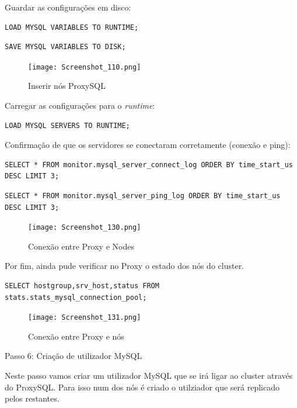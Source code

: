 \hfill \break
\indent Guardar as configurações em disco:
\begin{verbatim}LOAD MYSQL VARIABLES TO RUNTIME;\end{verbatim}
\begin{verbatim}SAVE MYSQL VARIABLES TO DISK;\end{verbatim}

\begin{figure}[H]
\center
\texttt{[image: Screenshot\_110.png]}
\caption{Inserir nós ProxySQL}
\end{figure}

\hfill \break
\indent Carregar as configurações para o \textit{runtime}:

\begin{verbatim}LOAD MYSQL SERVERS TO RUNTIME;\end{verbatim}

\newpage
Confirmação de que os servidores se conectaram corretamente (conexão e ping):

\begin{verbatim}SELECT * FROM monitor.mysql_server_connect_log ORDER BY time_start_us 
DESC LIMIT 3;\end{verbatim}

\begin{verbatim}SELECT * FROM monitor.mysql_server_ping_log ORDER BY time_start_us 
DESC LIMIT 3;\end{verbatim}


\begin{figure}[H]
\center
\texttt{[image: Screenshot\_130.png]}
\caption{Conexão entre Proxy e Nodes}
\end{figure}

\indent Por fim, ainda pude verificar no Proxy o estado dos nós do cluster.

\begin{verbatim}SELECT hostgroup,srv_host,status FROM stats.stats_mysql_connection_pool; \end{verbatim}

\begin{figure}[H]
\center
\texttt{[image: Screenshot\_131.png]}
\caption{Conexão entre Proxy e nós}
\end{figure}

\newpage
Passo 6: Criação de utilizador MySQL

\hfill \break
\indent Neste passo vamos criar um utilizador MySQL que se irá ligar ao cluster através do ProxySQL. Para isso num dos nós é criado o utilziador que será replicado pelos restantes.

